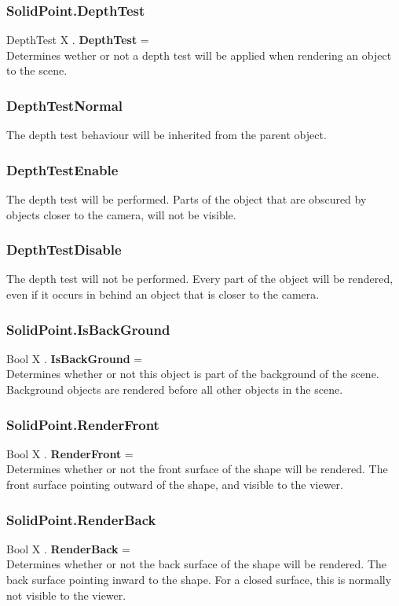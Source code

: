\subsubsection{SolidPoint.DepthTest \label{F:SolidPoint:DepthTest}}
DepthTest X . \textbf{DepthTest} = \\
Determines wether or not a depth test will be applied when rendering an object to the scene.

\subsubsection{DepthTestNormal \label{T:DepthTest|DepthTestNormal}}
The depth test behaviour will be inherited from the parent object.

\subsubsection{DepthTestEnable \label{T:DepthTest|DepthTestEnable}}
The depth test will be performed. Parts of the object that are obscured by objects closer to the camera, will not be visible.

\subsubsection{DepthTestDisable \label{T:DepthTest|DepthTestDisable}}
The depth test will not be performed. Every part of the object will be rendered, even if it occurs in behind an object that is closer to the camera.

\subsubsection{SolidPoint.IsBackGround \label{F:SolidPoint:IsBackGround}}
Bool X . \textbf{IsBackGround} = \\
Determines whether or not this object is part of the background of the scene. Background objects are rendered before all other objects in the scene.

\subsubsection{SolidPoint.RenderFront \label{F:SolidPoint:RenderFront}}
Bool X . \textbf{RenderFront} = \\
Determines whether or not the front surface of the shape will be rendered. The front surface pointing outward of the shape, and visible to the viewer.

\subsubsection{SolidPoint.RenderBack \label{F:SolidPoint:RenderBack}}
Bool X . \textbf{RenderBack} = \\
Determines whether or not the back surface of the shape will be rendered. The back surface pointing inward to the shape. For a closed surface, this is normally not visible to the viewer.

